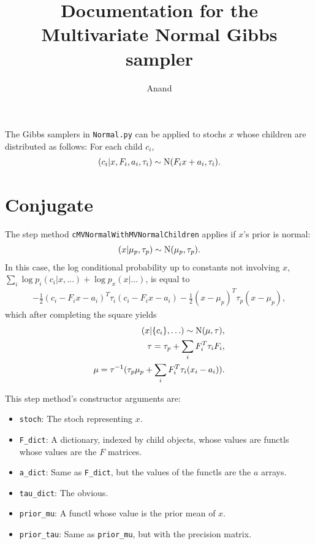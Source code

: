 \documentclass{article}
\begin{document}
\title{Documentation for the Multivariate Normal Gibbs sampler}
\author{Anand}
\maketitle

The Gibbs samplers in \texttt{Normal.py} can be applied to stochs $x$ whose children are distributed as follows: For each child $c_i$,
\begin{eqnarray*}
	(c_i | x, F_i, a_i, \tau_i) \sim \textup{N}(F_i x + a_i, \tau_i).
\end{eqnarray*}

\section{Conjugate}\label{conj}
The step method \texttt{cMVNormalWithMVNormalChildren} applies if $x$'s prior is normal:
\begin{eqnarray*}
	(x|\mu_p,\tau_p) \sim \textup{N}(\mu_p,\tau_p).
\end{eqnarray*}
In this case, the log conditional probability up to constants not involving $x$, $\sum_i \log p_i(c_i|x,\ldots) +\log p_x(x|\ldots)$, is equal to
\begin{eqnarray*}
	-\frac{1}{2}(c_i-F_ix-a_i)^T\tau_i(c_i-F_ix-a_i) - \frac{1}{2}(x-\mu_p)^T\tau_p(x-\mu_p),
\end{eqnarray*}
which after completing the square yields
\begin{eqnarray*}
	(x|\{c_i\},\ldots)\sim\textup{N}(\mu,\tau),\\
	\tau = \tau_p + \sum_i F_i^T \tau_i F_i,\\
	\mu = \tau^{-1}(\tau_p\mu_p + \sum_i F_i^T\tau_i(x_i-a_i)).
\end{eqnarray*}

This step method's constructor arguments are:
\begin{itemize}
	\item \texttt{stoch}: The stoch representing $x$. 
	\item \texttt{F\_dict}: A dictionary, indexed by child objects, whose values are functls whose values are the $F$ matrices. 
	\item \texttt{a\_dict}: Same as \texttt{F\_dict}, but the values of the functls are the $a$ arrays.
	\item \texttt{tau\_dict}: The obvious.
	\item \texttt{prior\_mu}: A functl whose value is the prior mean of $x$.
	\item \texttt{prior\_tau}: Same as \texttt{prior\_mu}, but with the precision matrix.    
\end{itemize}
\end{document}
